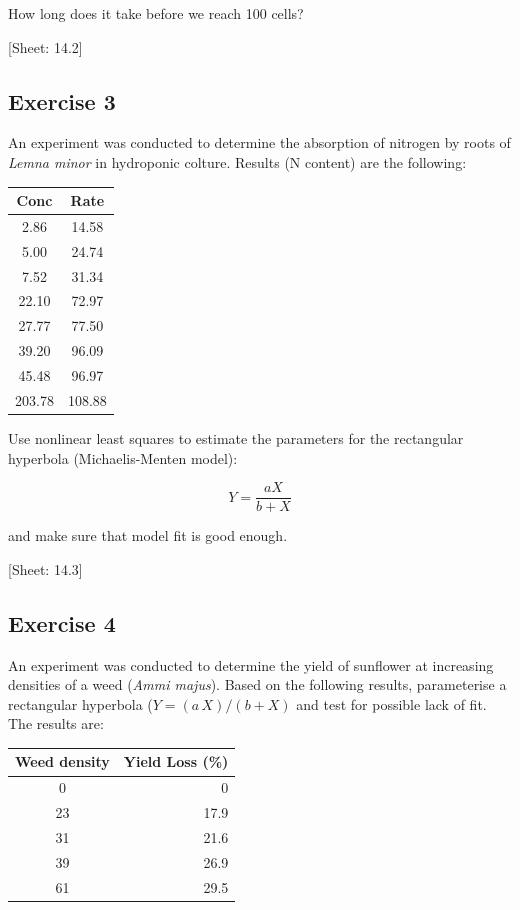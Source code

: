 \documentclass[a4paper,12pt,oneside]{book}
\begin{document}
How long does it take before we reach 100 cells?

{[}Sheet: 14.2{]}

\hypertarget{exercise-3-8}{%
\subsection{Exercise 3}\label{exercise-3-8}}

An experiment was conducted to determine the absorption of nitrogen by roots of \emph{Lemna minor} in hydroponic colture. Results (N content) are the following:

\begin{longtable}[]{@{}cc@{}}
\toprule()
Conc & Rate \\
\midrule()
\endhead
2.86 & 14.58 \\
5.00 & 24.74 \\
7.52 & 31.34 \\
22.10 & 72.97 \\
27.77 & 77.50 \\
39.20 & 96.09 \\
45.48 & 96.97 \\
203.78 & 108.88 \\
\bottomrule()
\end{longtable}

Use nonlinear least squares to estimate the parameters for the rectangular hyperbola (Michaelis-Menten model):

\[Y = \frac{a X} {b + X}\]

and make sure that model fit is good enough.

{[}Sheet: 14.3{]}

\hypertarget{exercise-4-5}{%
\subsection{Exercise 4}\label{exercise-4-5}}

An experiment was conducted to determine the yield of sunflower at increasing densities of a weed (\emph{Ammi majus}). Based on the following results, parameterise a rectangular hyperbola (\(Y = (a \, X)/(b + X)\) and test for possible lack of fit. The results are:

\begin{longtable}[]{@{}cr@{}}
\toprule()
Weed density & Yield Loss (\%) \\
\midrule()
\endhead
0 & 0 \\
23 & 17.9 \\
31 & 21.6 \\
39 & 26.9 \\
61 & 29.5 \\
\bottomrule()
\end{longtable}
\end{document}
